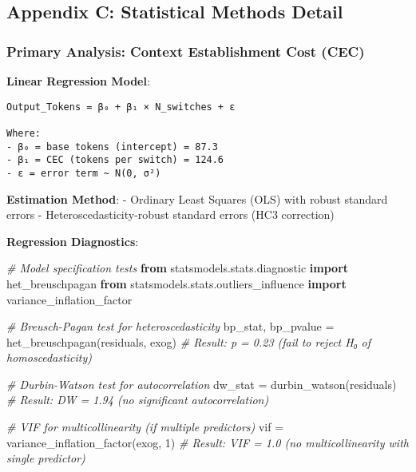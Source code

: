 \documentclass[
  11pt]{article}
\newenvironment{Shaded}{}{}
\newcommand{\CommentTok}[1]{\textcolor[rgb]{0.38,0.63,0.69}{\textit{#1}}}
\newcommand{\DecValTok}[1]{\textcolor[rgb]{0.25,0.63,0.44}{#1}}
\newcommand{\ImportTok}[1]{\textcolor[rgb]{0.00,0.50,0.00}{\textbf{#1}}}
\newcommand{\NormalTok}[1]{#1}
\newcommand{\OperatorTok}[1]{\textcolor[rgb]{0.40,0.40,0.40}{#1}}
\begin{document}
\subsection{Appendix C: Statistical Methods
Detail}\label{appendix-c-statistical-methods-detail}

\subsubsection{Primary Analysis: Context Establishment Cost
(CEC)}\label{primary-analysis-context-establishment-cost-cec}

\textbf{Linear Regression Model}:

\begin{verbatim}
Output_Tokens = β₀ + β₁ × N_switches + ε

Where:
- β₀ = base tokens (intercept) = 87.3
- β₁ = CEC (tokens per switch) = 124.6
- ε = error term ~ N(0, σ²)
\end{verbatim}

\textbf{Estimation Method}: - Ordinary Least Squares (OLS) with robust
standard errors - Heteroscedasticity-robust standard errors (HC3
correction)

\textbf{Regression Diagnostics}:

\begin{Shaded}
\begin{Highlighting}[]
\CommentTok{\# Model specification tests}
\ImportTok{from}\NormalTok{ statsmodels.stats.diagnostic }\ImportTok{import}\NormalTok{ het\_breuschpagan}
\ImportTok{from}\NormalTok{ statsmodels.stats.outliers\_influence }\ImportTok{import}\NormalTok{ variance\_inflation\_factor}

\CommentTok{\# Breusch{-}Pagan test for heteroscedasticity}
\NormalTok{bp\_stat, bp\_pvalue }\OperatorTok{=}\NormalTok{ het\_breuschpagan(residuals, exog)}
\CommentTok{\# Result: p = 0.23 (fail to reject H₀ of homoscedasticity)}

\CommentTok{\# Durbin{-}Watson test for autocorrelation}
\NormalTok{dw\_stat }\OperatorTok{=}\NormalTok{ durbin\_watson(residuals)}
\CommentTok{\# Result: DW = 1.94 (no significant autocorrelation)}

\CommentTok{\# VIF for multicollinearity (if multiple predictors)}
\NormalTok{vif }\OperatorTok{=}\NormalTok{ variance\_inflation\_factor(exog, }\DecValTok{1}\NormalTok{)}
\CommentTok{\# Result: VIF = 1.0 (no multicollinearity with single predictor)}
\end{Highlighting}
\end{Shaded}
\end{document}
